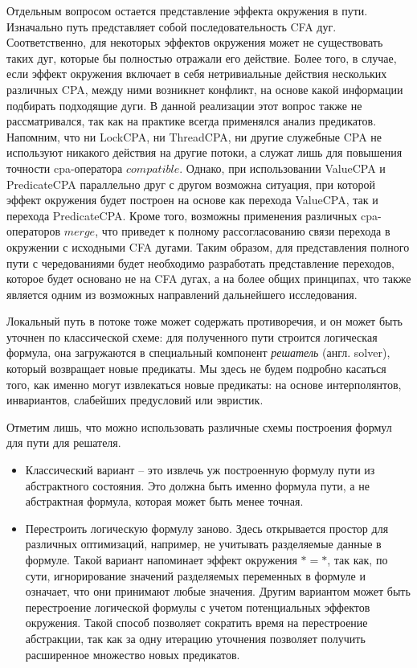 Отдельным вопросом остается представление эффекта окружения в пути. 
Изначально путь представляет собой последовательность CFA дуг.
Соответственно, для некоторых эффектов окружения может не существовать таких дуг, которые бы полностью отражали его действие.
Более того, в случае, если эффект окружения включает в себя нетривиальные действия нескольких различных CPA, между ними возникнет конфликт, на основе какой информации подбирать подходящие дуги.
В данной реализации этот вопрос также не рассматривался, так как на практике всегда применялся анализ предикатов.
Напомним, что ни LockCPA, ни ThreadCPA, ни другие служебные CPA не используют никакого действия на другие потоки, а служат лишь для повышения точности cpa-оператора $compatible$.
Однако, при использовании ValueCPA и PredicateCPA параллельно друг с другом возможна ситуация, при которой эффект окружения будет построен на основе как перехода ValueCPA, так и перехода PredicateCPA.
Кроме того, возможны применения различных cpa-операторов $merge$, что приведет к полному рассогласованию связи перехода в окружении с исходными CFA дугами.
Таким образом, для представления полного пути с чередованиями будет необходимо разработать представление переходов, которое будет основано не на CFA дугах, а на более общих принципах, что также является одним из возможных направлений дальнейшего исследования.

Локальный путь в потоке тоже может содержать противоречия, и он может быть уточнен по классической схеме: для полученного пути строится логическая формула, она загружаются в специальный компонент \textit{решатель} (англ. solver), который возвращает новые предикаты.
Мы здесь не будем подробно касаться того, как именно могут извлекаться новые предикаты: на основе интерполянтов, инвариантов, слабейших предусловий или эвристик. 

Отметим лишь, что можно использовать различные схемы построения формул для пути для решателя.
\begin{itemize}
\item Классический вариант -- это извлечь уж построенную формулу пути из абстрактного состояния. 
Это должна быть именно формула пути, а не абстрактная формула, которая может быть менее точная.
\item Перестроить логическую формулу заново. Здесь открывается простор для различных оптимизаций, например, не учитывать разделяемые данные в формуле.
Такой вариант напоминает эффект окружения $* = *$, так как, по сути, игнорирование значений разделяемых переменных в формуле и означает, что они принимают любые значения.
Другим вариантом может быть перестроение логической формулы с учетом потенциальных эффектов окружения. 
Такой способ позволяет сократить время на перестроение абстракции, так как за одну итерацию уточнения позволяет получить расширенное множество новых предикатов.
\end{itemize}

